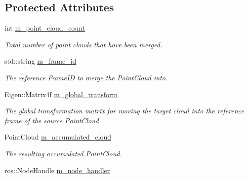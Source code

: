 \subsection*{\-Protected \-Attributes}
\begin{DoxyCompactItemize}
\item 
\hypertarget{class_point_cloud_accumulator_a6ebb0ca53506f1ae2d0f6e411e2dff66}{int \hyperlink{class_point_cloud_accumulator_a6ebb0ca53506f1ae2d0f6e411e2dff66}{m\-\_\-point\-\_\-cloud\-\_\-count}}\label{class_point_cloud_accumulator_a6ebb0ca53506f1ae2d0f6e411e2dff66}

\begin{DoxyCompactList}\small\item\em \-Total number of point clouds that have been merged. \end{DoxyCompactList}\item 
\hypertarget{class_point_cloud_accumulator_af8ef35b00c6d547b8d3fa89ad8a8b49a}{std\-::string \hyperlink{class_point_cloud_accumulator_af8ef35b00c6d547b8d3fa89ad8a8b49a}{m\-\_\-frame\-\_\-id}}\label{class_point_cloud_accumulator_af8ef35b00c6d547b8d3fa89ad8a8b49a}

\begin{DoxyCompactList}\small\item\em \-The reference \-Frame\-I\-D to merge the \-Point\-Cloud into. \end{DoxyCompactList}\item 
\hypertarget{class_point_cloud_accumulator_a7ea0dd4449475e6939cefbdb0fd260c5}{\-Eigen\-::\-Matrix4f \hyperlink{class_point_cloud_accumulator_a7ea0dd4449475e6939cefbdb0fd260c5}{m\-\_\-global\-\_\-transform}}\label{class_point_cloud_accumulator_a7ea0dd4449475e6939cefbdb0fd260c5}

\begin{DoxyCompactList}\small\item\em \-The global transformation matrix for moving the target cloud into the reference frame of the source \-Point\-Cloud. \end{DoxyCompactList}\item 
\hypertarget{class_point_cloud_accumulator_a0db3c1a8e6de37bcb25c260626d63ff0}{\-Point\-Cloud \hyperlink{class_point_cloud_accumulator_a0db3c1a8e6de37bcb25c260626d63ff0}{m\-\_\-accumulated\-\_\-cloud}}\label{class_point_cloud_accumulator_a0db3c1a8e6de37bcb25c260626d63ff0}

\begin{DoxyCompactList}\small\item\em \-The resulting accumulated \-Point\-Cloud. \end{DoxyCompactList}\item 
\hypertarget{class_point_cloud_accumulator_ac9070e4cb82ddf04bb50cc2492e597ae}{ros\-::\-Node\-Handle \hyperlink{class_point_cloud_accumulator_ac9070e4cb82ddf04bb50cc2492e597ae}{m\-\_\-node\-\_\-handler}}\label{class_point_cloud_accumulator_ac9070e4cb82ddf04bb50cc2492e597ae}


\end{DoxyCompactItemize}
